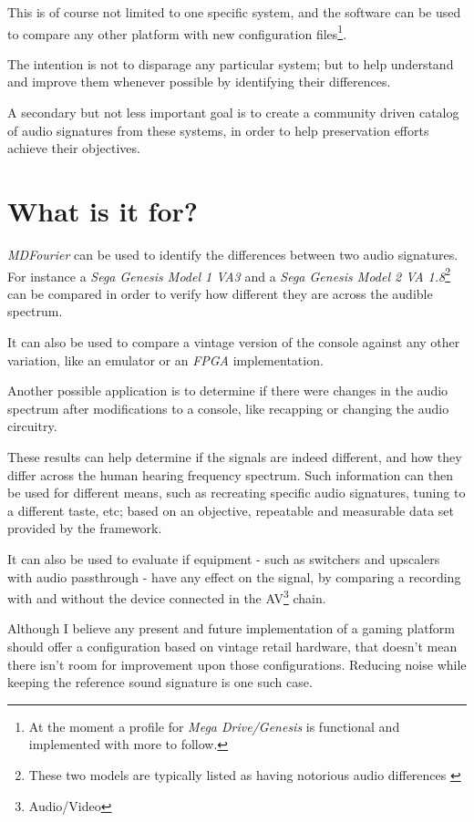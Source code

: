 \documentclass[10pt,a4paper]{report}
\begin{document}
This is of course not limited to one specific system, and the software can be used to compare any other platform with new configuration files\footnote{At the moment a profile for \textit{Mega Drive/Genesis} is functional and implemented with more to follow.}.

The intention is not to disparage any particular system; but to help understand and improve them whenever possible by identifying their differences.

A secondary but not less important goal is to create a community driven catalog of audio signatures from these systems, in order to help preservation efforts achieve their objectives.


\section{What is it for?}

\textit{MDFourier} can be used to identify the differences between two audio signatures. For instance a \textit{Sega Genesis Model 1 VA3} and a \textit{Sega Genesis Model 2 VA 1.8}\footnote{These two models are typically listed as having notorious audio differences \cite{genesisaudio}} can be compared in order to verify how different they are across the audible spectrum. 

It can also be used to compare a vintage version of the console against any other variation, like an emulator or an \textit{FPGA} implementation.

Another possible application is to determine if there were changes in the audio spectrum after modifications to a console, like recapping or changing the audio circuitry.

These results can help determine if the signals are indeed different, and how they differ across the human hearing frequency spectrum. Such information can then be used for different means, such as recreating specific audio signatures, tuning to a different taste, etc; based on an objective, repeatable and measurable data set provided by the framework.

It can also be used to evaluate if equipment - such as switchers and upscalers with audio passthrough - have any effect on the signal, by comparing a recording with and without the device connected in the AV\footnote{Audio/Video} chain.

Although I believe any present and future implementation of a gaming platform should offer a configuration based on vintage retail hardware, that doesn't mean there isn't room for improvement upon those configurations. Reducing noise while keeping the reference sound signature is one such case.
\end{document}
